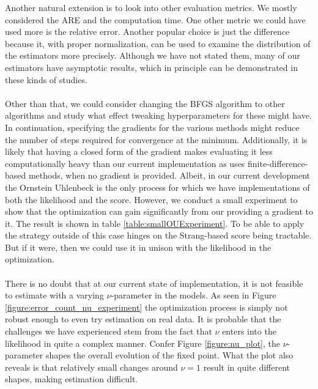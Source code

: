 Another natural extension is to look into other evaluation metrics. We mostly considered the ARE and the computation time. One other metric we could have used more is the relative error. Another popular choice is just the difference because it, with proper normalization, can be used to examine the distribution of the estimators more precisely. Although we have not stated them, many of our estimators have asymptotic results, which in principle can be demonstrated in these kinds of studies.\\\\
Other than that, we could consider changing the BFGS algorithm to other algorithms and study what effect tweaking hyperparameters for these might have. In continuation, specifying the gradients for the various methods might reduce the number of steps required for convergence at the minimum. Additionally, it is likely that having a closed form of the gradient makes evaluating it less computationally heavy than our current implementation as  uses finite-difference-based methods, when no gradient is provided. Albeit, in our current development the Ornstein Uhlenbeck is the only process for which we have implementations of both the likelihood and the score. However, we conduct a small experiment to show that the optimization can gain significantly from our providing a gradient to it. The result is shown in table \ref{table:smallOUExperiment}. To be able to apply the strategy outside of this case hinges on the Strang-based score being tractable. But if it were, then we could use it in unison with the likelihood in the optimization.\\\\
There is no doubt that at our current state of implementation, it is not feasible to estimate with a varying $\nu$-parameter in the models. As seen in Figure \ref{figure:error_count_nu_experiment} the optimization process is simply not robust enough to even try estimation on real data. It is probable that the challenges we have experienced stem from the fact that $\nu$ enters into the likelihood in quite a complex manner. Confer Figure \ref{figure:nu_plot}, the $\nu$-parameter shapes the overall evolution of the fixed point. What the plot also reveals is that relatively small changes around $\nu = 1$ result in quite different shapes, making estimation difficult.
 
